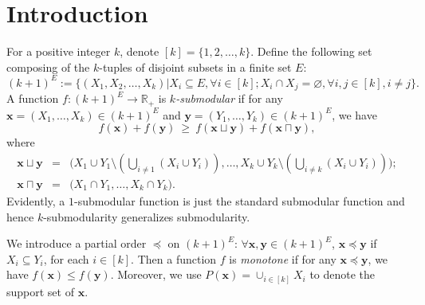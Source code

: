 \documentclass[preprint,12pt]{elsarticle}
\def\bx{\boldsymbol{x}}
\def\by{\boldsymbol{y}}
\begin{document}







\section{Introduction}
For a positive integer $k$, denote $[k]=\{1,2,\ldots,k\}$. Define the following set composing of the $k$-tuples of disjoint subsets in a finite set $E$:
\[
(k+1)^E:=\{(X_1,X_2,\ldots,X_k) | X_i\subseteq E, \forall i\in [k]; X_i\cap X_j=\varnothing, \forall i,j\in [k], i\neq j\}.
\]
A function $f:(k+1)^E\rightarrow \mathbb{R}_+$ is \emph{$k$-submodular} if for any $\bx=(X_1,\dots, X_k)\in (k+1)^E$ and $\by=(Y_1,\dots, Y_k)\in (k+1)^E$, we have
\[ f(\bx)+f(\by) \ \ge \ f(\bx\sqcup\by)+f(\bx\sqcap\by), \]
where
\begin{eqnarray*}
\bx\sqcup\by&=&\bigg(X_1\cup Y_1\setminus(\bigcup_{i\ne 1}(X_i\cup Y_i)), \dots,X_k\cup Y_k\setminus(\bigcup_{i\ne k}(X_i\cup Y_i))\bigg);\\
\bx\sqcap\by&=&\bigg(X_1\cap Y_1, \dots, X_k\cap Y_k\bigg).
\end{eqnarray*}
Evidently,  a $1$-submodular function is just the standard submodular function and hence $k$-submodularity generalizes submodularity.


We introduce a partial order $\preceq$ on $(k+1)^E$: $\forall \bx, \by\in (k+1)^E$, $\bx \preceq \by$ if $X_i\subseteq Y_i$, for each $i\in [k]$. Then a function $f$ is \emph{monotone} if for any $\bx \preceq \by$, we have
$f(\bx)\leq f(\by)$. Moreover, we use $P(\bx)=\cup_{i\in [k]}X_i$ to denote the support set of $\bx$.
\end{document}
